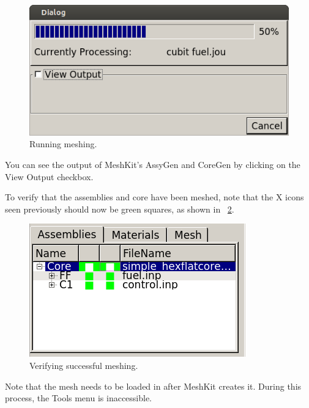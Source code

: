 \begin{figure}[H]
	\begin{center}
		\includegraphics[width=0.5\linewidth]{Images/mesh-5.png}
		\caption{Running meshing.}
		\label{fig:Mesh5}
	\end{center}
\end{figure}

You can see the output of MeshKit's AssyGen and CoreGen by clicking on the View Output checkbox.

To verify that the assemblies and core have been meshed, note that the X icons seen previously should now be green squares, as shown in ~\ref{fig:Mesh6}.

\begin{figure}[H]
	\begin{center}
		\includegraphics[width=0.5\linewidth]{Images/mesh-6.png}
		\caption{Verifying successful meshing.}
		\label{fig:Mesh6}
	\end{center}
\end{figure}

Note that the mesh needs to be loaded in after MeshKit creates it.  During this process, the Tools menu is inaccessible.
